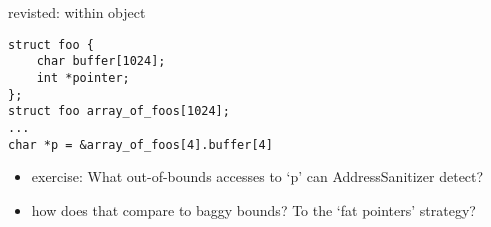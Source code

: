 \begin{frame}[fragile,label=withinObj]{revisted: within object}
\begin{lstlisting}
struct foo {
    char buffer[1024];
    int *pointer;
};
struct foo array_of_foos[1024];
...
char *p = &array_of_foos[4].buffer[4]
\end{lstlisting}
\begin{itemize}
\item exercise: What out-of-bounds accesses to `p' can AddressSanitizer detect?
\item how does that compare to baggy bounds? To the `fat pointers' strategy?
\end{itemize}
\end{frame}
